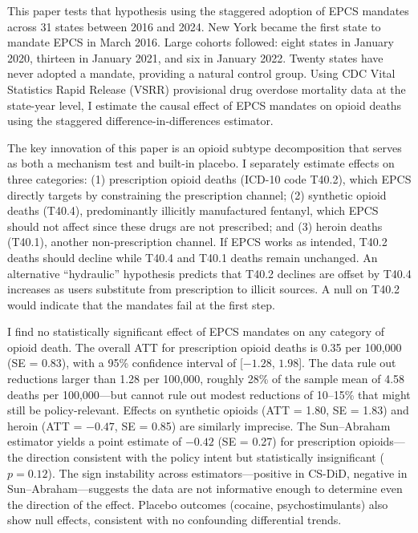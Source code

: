 \documentclass[12pt]{article}
\begin{document}
This paper tests that hypothesis using the staggered adoption of EPCS mandates across 31 states between 2016 and 2024. New York became the first state to mandate EPCS in March 2016. Large cohorts followed: eight states in January 2020, thirteen in January 2021, and six in January 2022. Twenty states have never adopted a mandate, providing a natural control group. Using CDC Vital Statistics Rapid Release (VSRR) provisional drug overdose mortality data at the state-year level, I estimate the causal effect of EPCS mandates on opioid deaths using the \citet{callaway2021} staggered difference-in-differences estimator.

The key innovation of this paper is an opioid subtype decomposition that serves as both a mechanism test and built-in placebo. I separately estimate effects on three categories: (1) prescription opioid deaths (ICD-10 code T40.2), which EPCS directly targets by constraining the prescription channel; (2) synthetic opioid deaths (T40.4), predominantly illicitly manufactured fentanyl, which EPCS should not affect since these drugs are not prescribed; and (3) heroin deaths (T40.1), another non-prescription channel. If EPCS works as intended, T40.2 deaths should decline while T40.4 and T40.1 deaths remain unchanged. An alternative ``hydraulic'' hypothesis predicts that T40.2 declines are offset by T40.4 increases as users substitute from prescription to illicit sources. A null on T40.2 would indicate that the mandates fail at the first step.

I find no statistically significant effect of EPCS mandates on any category of opioid death. The overall ATT for prescription opioid deaths is 0.35 per 100,000 (SE = 0.83), with a 95\% confidence interval of [$-1.28$, $1.98$]. The data rule out reductions larger than 1.28 per 100,000, roughly 28\% of the sample mean of 4.58 deaths per 100,000---but cannot rule out modest reductions of 10--15\% that might still be policy-relevant. Effects on synthetic opioids (ATT = 1.80, SE = 1.83) and heroin (ATT = $-0.47$, SE = 0.85) are similarly imprecise. The Sun--Abraham estimator yields a point estimate of $-0.42$ (SE = 0.27) for prescription opioids---the direction consistent with the policy intent but statistically insignificant ($p = 0.12$). The sign instability across estimators---positive in CS-DiD, negative in Sun--Abraham---suggests the data are not informative enough to determine even the direction of the effect. Placebo outcomes (cocaine, psychostimulants) also show null effects, consistent with no confounding differential trends.
\end{document}
